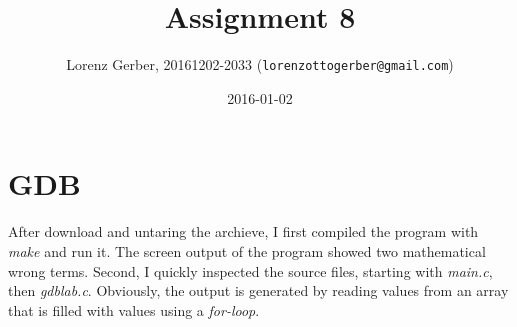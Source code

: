 \documentclass[a4paper,11pt,twoside]{article}
\title{Assignment 8}
\author{Lorenz Gerber, 20161202-2033 ({\tt{lorenzottogerber@gmail.com}})}
\date{2016-01-02}
\begin{document}
\lstset{language=C}
\maketitle
\thispagestyle{empty}
\newpage

\clearpage
{}

\section{GDB} 
After download and untaring the archieve, I first compiled the program with \textit{make} and run it. The screen output of the program showed two mathematical wrong terms. Second, I quickly inspected the source files, starting with \textit{main.c}, then \textit{gdblab.c}. Obviously, the output is generated by reading values from an array that is filled with values using a \textit{for-loop}.
\end{document}
